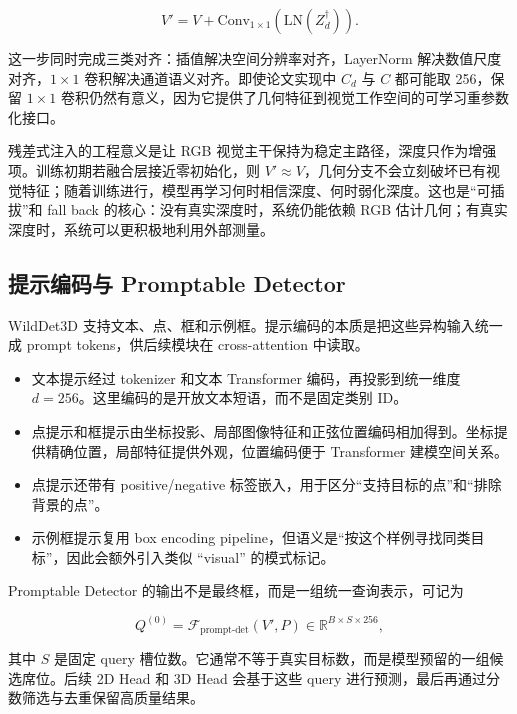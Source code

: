 \begin{equation}
    V' = V + \mathrm{Conv}_{1\times1}(\mathrm{LN}(Z_d^{\dagger})).
\end{equation}

这一步同时完成三类对齐：插值解决空间分辨率对齐，LayerNorm 解决数值尺度对齐，$1\times1$ 卷积解决通道语义对齐。即使论文实现中 $C_d$ 与 $C$ 都可能取 256，保留 $1\times1$ 卷积仍然有意义，因为它提供了几何特征到视觉工作空间的可学习重参数化接口。

残差式注入的工程意义是让 RGB 视觉主干保持为稳定主路径，深度只作为增强项。训练初期若融合层接近零初始化，则 $V' \approx V$，几何分支不会立刻破坏已有视觉特征；随着训练进行，模型再学习何时相信深度、何时弱化深度。这也是“可插拔”和 fall back 的核心：没有真实深度时，系统仍能依赖 RGB 估计几何；有真实深度时，系统可以更积极地利用外部测量。

\subsection{提示编码与 Promptable Detector}

WildDet3D 支持文本、点、框和示例框。提示编码的本质是把这些异构输入统一成 prompt tokens，供后续模块在 cross-attention 中读取。

\begin{itemize}
    \item 文本提示经过 tokenizer 和文本 Transformer 编码，再投影到统一维度 $d=256$。这里编码的是开放文本短语，而不是固定类别 ID。
    \item 点提示和框提示由坐标投影、局部图像特征和正弦位置编码相加得到。坐标提供精确位置，局部特征提供外观，位置编码便于 Transformer 建模空间关系。
    \item 点提示还带有 positive/negative 标签嵌入，用于区分“支持目标的点”和“排除背景的点”。
    \item 示例框提示复用 box encoding pipeline，但语义是“按这个样例寻找同类目标”，因此会额外引入类似 ``visual'' 的模式标记。
\end{itemize}

Promptable Detector 的输出不是最终框，而是一组统一查询表示，可记为

\begin{equation}
    Q^{(0)} = \mathcal{F}_{\text{prompt-det}}(V', P)
    \in \mathbb{R}^{B \times S \times 256},
\end{equation}

其中 $S$ 是固定 query 槽位数。它通常不等于真实目标数，而是模型预留的一组候选席位。后续 2D Head 和 3D Head 会基于这些 query 进行预测，最后再通过分数筛选与去重保留高质量结果。


